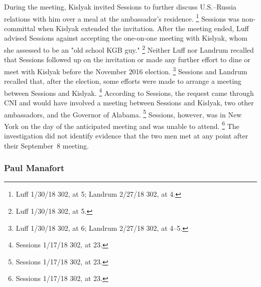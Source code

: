 During the meeting, Kislyak invited Sessions to further discuss U.S.--Russia relations with him over a meal at the ambassador's residence.%
\footnote{Luff 1/30/18 302, at 5;
Landrum 2/27/18 302, at 4.}
Sessions was non-committal when Kislyak extended the invitation.
After the meeting ended, Luff advised Sessions against accepting the one-on-one meeting with Kislyak, whom she assessed to be an "old school KGB guy."%
\footnote{Luff 1/30/18 302, at 5.}
Neither Luff nor Landrum recalled that Sessions followed up on the invitation or made any further effort to dine or meet with Kislyak before the November 2016 election.%
\footnote{Luff 1/30/18 302, at 6;
Landrum 2/27/18 302, at 4--5.}
Sessions and Landrum recalled that, after the election, some efforts were made to arrange a meeting between Sessions and Kislyak.%
\footnote{Sessions 1/17/18 302, at 23.}
According to Sessions, the request came through CNI and would have involved a meeting between Sessions and Kislyak, two other ambassadors, and the Governor of Alabama.%
\footnote{Sessions 1/17/18 302, at 23.}
Sessions, however, was in New York on the day of the anticipated meeting and was unable to attend.%
\footnote{Sessions 1/17/18 302, at 23.}
The investigation did not identify evidence that the two men met at any point after their September~8 meeting.

\subsubsection{Paul Manafort}

